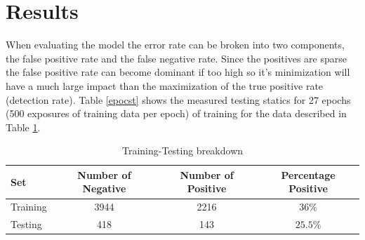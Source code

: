 \documentclass[12pt, a4paper]{article}
\begin{document}
\section{Results}

When evaluating the model the error rate can be broken into two components, the false positive rate and the false negative rate. Since the positives are sparse the false positive rate can become dominant if too high so it's minimization will have a much large impact than the maximization of the true positive rate (detection rate). Table \ref{epocst} shows the measured testing statics for 27 epochs (500 exposures of training data per epoch) of training for the data described in Table \ref{ttb}.

\begin{table}[H]
	\begin{tabular}{|l|ccc|}
		\toprule
		Set & Number of Negative & Number of Positive & Percentage Positive\\
		\midrule
		Training &3944 & 2216 & $36\%$\\
		Testing & 418 &143 & $25.5\%$ \\
		\bottomrule
	\end{tabular} 
\caption{Training-Testing breakdown}\label{ttb}
\end{table}
\end{document}
